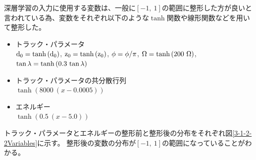 深層学習の入力に使用する変数は、一般に$[-1,\ 1]$の範囲に整形した方が良いと言われている為、変数をそれぞれ以下のような$\tanh$関数や線形関数などを用いて整形した。

\begin{itemize}
 \item トラック・パラメータ\\
 ${\rm d_0} = \tanh{({\rm d_0})}$,
 ${\rm z_0} = \tanh{({\rm z_0})}$,
 ${\rm \phi} = {\rm \phi}/\pi$,
 ${\rm \Omega} = \tanh{(200\ {\rm \Omega})}$,
 ${\rm \tan{\lambda}} = \tanh{(0.3\ {\rm \tan{\lambda}})}$
 \item トラック・パラメータの共分散行列\\
 $\tanh{(8000\ (x-0.0005))}$
 \item エネルギー\\
 $\tanh{(0.5\ (x-5.0))}$
\end{itemize}

トラック・パラメータとエネルギーの整形前と整形後の分布をそれぞれ図\ref{3-1-2-2Variables}に示す。
整形後の変数の分布が$[-1,\ 1]$の範囲になっていることがわかる。


